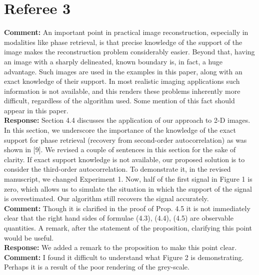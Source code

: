 \documentclass[12pt]{article}
\newcommand{\1}{\mathbf{1}}
\newcommand{\TODO}[1]{{\color{red}{[#1]}}}
\theoremstyle{plain}
\theoremstyle{definition}
\theoremstyle{remark}
\theoremstyle{plain}
\theoremstyle{remark}
\theoremstyle{plain}
\theoremstyle{plain}
\theoremstyle{plain}
\numberwithin{equation}{section}
\begin{document}

\section{Referee 3}

\noindent \textbf{Comment:} An important point in practical image reconstruction, especially in modalities like phase retrieval, is that precise knowledge of the support of the image makes the reconstruction problem considerably easier.  Beyond that, having an image with a sharply delineated, known boundary is, in fact, a huge advantage. Such images are used in the examples in this paper, along with an exact knowledge of their support.  In most realistic imaging applications such information is not available, and this renders these problems inherently more difficult, regardless of the algorithm used. Some mention of this fact should appear in this paper.\\

\noindent \textbf{Response:} Section 4.4 discusses the application of our approach to 2-D images. In this section, we underscore the importance of the knowledge of the exact support for phase retrieval (recovery from second-order autocorrelation) as was shown in [9]. 
We revised a couple of sentences in this section for the sake of clarity. 
If exact support knowledge is not available, our proposed solution is to consider the third-order autocorrelation.
To demonstrate it, in the revised manuscript, we changed Experiment 1. Now, half of the first signal in Figure 1 is zero, which allows us to simulate the situation in which the support of the signal is overestimated. Our algorithm still recovers the signal accurately. \\

\noindent \textbf{Comment:} Though it is clarified in the proof of Prop. 4.5 it is not immediately clear that  the right hand sides of formulae (4.3), (4.4), (4.5) are observable quantities. A remark, after the statement of the proposition, clarifying this  point would be useful.\\

\noindent \textbf{Response:} We added a remark to the proposition to make this point clear.\\

\noindent \textbf{Comment:}  I found it difficult to understand what Figure 2 is demonstrating. Perhaps it is a result of the poor rendering of the grey-scale.
\\ 
\end{document}
